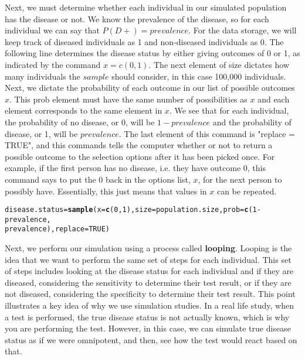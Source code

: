 \documentclass[11pt]{article}\usepackage[]{graphicx}\usepackage[]{color}
\makeatletter
\newcommand{\hlnum}[1]{\textcolor[rgb]{0.686,0.059,0.569}{#1}}%
\newcommand{\hlopt}[1]{\textcolor[rgb]{0,0,0}{#1}}%
\newcommand{\hlstd}[1]{\textcolor[rgb]{0.345,0.345,0.345}{#1}}%
\newcommand{\hlkwb}[1]{\textcolor[rgb]{0.69,0.353,0.396}{#1}}%
\newcommand{\hlkwc}[1]{\textcolor[rgb]{0.333,0.667,0.333}{#1}}%
\newcommand{\hlkwd}[1]{\textcolor[rgb]{0.737,0.353,0.396}{\textbf{#1}}}%
\newenvironment{kframe}{%
 \def\at@end@of@kframe{}%
 \ifinner\ifhmode%
  \def\at@end@of@kframe{\end{minipage}}%
  \begin{minipage}{\columnwidth}%
 \fi\fi%
 \def\FrameCommand##1{\hskip\@totalleftmargin \hskip-\fboxsep
 \colorbox{shadecolor}{##1}\hskip-\fboxsep
     \hskip-\linewidth \hskip-\@totalleftmargin \hskip\columnwidth}%
 \MakeFramed {\advance\hsize-\width
   \@totalleftmargin\z@ \linewidth\hsize
   \@setminipage}}%
 {\par\unskip\endMakeFramed%
 \at@end@of@kframe}
\newenvironment{knitrout}{}{} %
\makeatother
\begin{document}
Next, we must determine whether each individual in our simulated population has the disease or not.  We know the prevalence of the disease, so for each individual we can say that $P(D+) = prevalence$.  For the data storage, we will keep track of diseased individuals as 1 and non-diseased individuals as 0.  The following line determines the disease status by either giving outcomes of 0 or 1, as indicated by the command $x = c(0,1)$. The next element of size dictates how many individuals the $sample$ should consider, in this case 100,000 individuals.  Next, we dictate the probability of each outcome in our list of possible outcomes $x$.  This prob element must have the same number of possibilities as $x$ and each element corresponds to the same element in $x$.  We see that for each individual, the probability of no disease, or 0, will be $1-prevalence$ and the probability of disease, or 1, will be $prevalence$.  The last element of this command is "replace = TRUE", and this commands tells the computer whether or not to return a possible outcome to the selection options after it has been picked once.  For example, if the first person has no disease, i.e. they have outcome 0, this command says to put the 0 back in the options list, $x$, for the next person to possibly have.  Essentially, this just means that values in $x$ can be repeated.  
\begin{knitrout}
\color{fgcolor}\begin{kframe}
\begin{alltt}
\hlstd{disease.status} \hlkwb{=} \hlkwd{sample}\hlstd{(}\hlkwc{x} \hlstd{=} \hlkwd{c}\hlstd{(}\hlnum{0}\hlstd{,}\hlnum{1}\hlstd{),} \hlkwc{size} \hlstd{= population.size,} \hlkwc{prob}\hlstd{=}\hlkwd{c}\hlstd{(}\hlnum{1} \hlopt{-} \hlstd{prevalence,}
              \hlstd{prevalence),} \hlkwc{replace} \hlstd{=} \hlnum{TRUE}\hlstd{)}
\end{alltt}
\end{kframe}
\end{knitrout}

Next, we perform our simulation using a process called \textbf{looping}.  Looping is the idea that we want to perform the same set of steps for each individual.  This set of steps includes looking at the disease status for each individual and if they are diseased, considering the sensitivity to determine their test result, or if they are not diseased, considering the specificity to determine their test result.  This point illustrates a key idea of why we use simulation studies.  In a real life study, when a test is performed, the true disease status is not actually known, which is why you are performing the test.  However, in this case, we can simulate true disease status as if we were omnipotent, and then, see how the test would react based on that.
\end{document}
